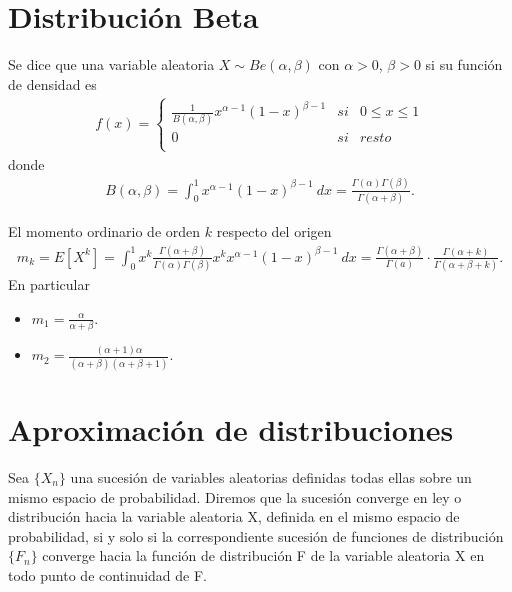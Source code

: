 \section{Distribución Beta}

\begin{defi}
Se dice que una variable aleatoria $X \sim Be(\alpha, \beta)$ con $\alpha > 0$, $\beta > 0$ si su función de densidad es
\begin{align*}
    f(x) = \left\{ \begin{array}{lcc}
             \frac{1}{B(\alpha, \beta)}x^{\alpha - 1}(1 - x)^{\beta - 1} &  si  & 0 \leq x \leq 1\\
             0 &  si  & resto\\
             \end{array}
        \right. 
\end{align*}
donde
\begin{align*}
    B(\alpha, \beta) = \int_{0}^{1}{x^{\alpha - 1}(1 - x)^{\beta - 1} \ dx} = \frac{\Gamma(\alpha)\Gamma(\beta)}{\Gamma(\alpha + \beta)}.
\end{align*}
\end{defi}

\begin{obs}
El momento ordinario de orden $k$ respecto del origen
\begin{align*}
    m_k = E[X^k] = \int_{0}^{1}{x^k\frac{\Gamma(\alpha + \beta)}{\Gamma(\alpha)\Gamma(\beta)}x^kx^{\alpha -1}(1-x)^{\beta -1} \ dx} = \frac{\Gamma(\alpha + \beta)}{\Gamma(a)} \cdot \frac{\Gamma(\alpha + k)}{\Gamma(\alpha + \beta + k)}.
\end{align*}
En particular
\begin{itemize}
    \item $m_1 = \frac{\alpha}{\alpha + \beta}$.
    \item $m_2 = \frac{(\alpha + 1)\alpha}{(\alpha + \beta)(\alpha + \beta + 1)}$.
\end{itemize}
\end{obs}

\section{Aproximación de distribuciones}

\begin{defi}
Sea $\{X_n\}$ una sucesión de variables aleatorias definidas todas ellas sobre un mismo espacio de probabilidad. Diremos que la sucesión converge en ley o distribución hacia la variable aleatoria X, definida en el mismo espacio de probabilidad, si y solo si la correspondiente sucesión de funciones de distribución $\{F_n\}$ converge hacia la función de distribución F de la variable aleatoria X en todo punto de continuidad de F.
\end{defi}

